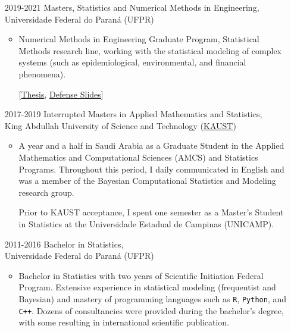 \documentclass[12pt]{article}
\begin{document}
\begin{itemize}
 \item[2019-2021] Masters, Statistics and Numerical Methods in
                  Engineering,\\
                  Universidade Federal do Paran\'{a} (UFPR)
  \begin{itemize}
  \item Numerical Methods in Engineering Graduate Program, Statistical
        Methods research line, working with the statistical modeling of
        complex systems (such as epidemiological, environmental, and
        financial phenomena).
         
         [\href{https://henriquelaureano.github.io/THESIS/thesis/thesis.pdf}{\color{blue}Thesis},
          \href{https://henriquelaureano.github.io/THESIS/aqua/slides.pdf}{\color{blue}Defense Slides}]
  \end{itemize}

 \item[2017-2019] Interrupted Masters in Applied Mathematics and
                  Statistics,\\
                  King Abdullah University of Science and Technology
                  (\href{https://kaust.edu.sa/en}{\color{blue}KAUST})
  \begin{itemize}
   \item A year and a half in Saudi Arabia as a Graduate Student in the
         Applied Mathematics and Computational Sciences (AMCS) and
         Statistics Programs. Throughout this period, I daily
         communicated in English and was a member of the Bayesian
         Computational Statistics and Modeling research group.

         Prior to KAUST acceptance, I spent one semester as a Master's
         Student in Statistics at the Universidade Estadual de Campinas
         (UNICAMP).
  \end{itemize}

 \item[2011-2016] Bachelor in Statistics,\\
                  Universidade Federal do Paran\'{a}
                  (UFPR)
  \begin{itemize}
   \item Bachelor in Statistics with two years of Scientific Initiation
         Federal Program. Extensive experience in statistical modeling
         (frequentist and Bayesian) and mastery of programming languages
         such as \texttt{R}, \texttt{Python}, and \texttt{C++}. Dozens
         of consultancies were provided during the bachelor's degree,
         with some resulting in international scientific publication.
  \end{itemize}
\end{itemize}
\end{document}
